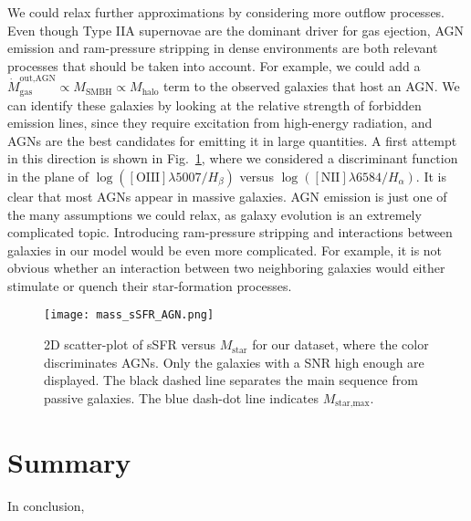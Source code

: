 \documentclass[fleqn,usenatbib]{mnras}
\begin{document}
We could relax further approximations by considering more outflow processes. Even though Type IIA supernovae are the dominant driver for gas ejection, AGN emission and ram-pressure stripping in dense environments are both relevant processes that should be taken into account. For example, we could add a $\dot{M}_\text{gas}^\text{out,AGN} \propto M_\text{SMBH} \propto M_\text{halo}$ term to the observed galaxies that host an AGN. We can identify these galaxies by looking at the relative strength of forbidden emission lines, since they require excitation from high-energy radiation, and AGNs are the best candidates for emitting it in large quantities. A first attempt in this direction is shown in Fig.~\ref{fig:mass_sSFR_AGN.png}, where we considered a discriminant function \citep{Kauffmann_2003_AGN} in the plane of $\log\left(\left[\text{OIII}\right]\lambda 5007 / H_\beta\right)$ versus $\log\left(\left[\text{NII}\right]\lambda 6584 / H_\alpha\right)$. It is clear that most AGNs appear in massive galaxies.
AGN emission is just one of the many assumptions we could relax, as galaxy evolution is an extremely complicated topic.
Introducing ram-pressure stripping and interactions between galaxies in our model would be even more complicated. For example, it is not obvious whether an interaction between two neighboring galaxies would either stimulate or quench their star-formation processes.
\begin{figure}\centering
	\texttt{[image: mass\_sSFR\_AGN.png]}
    \caption{2D scatter-plot of sSFR versus $M_\text{star}$ for our dataset, where the color discriminates AGNs. Only the galaxies with a SNR high enough are displayed. The black dashed line separates the main sequence from passive galaxies. The blue dash-dot line indicates $M_\text{star,max}$.}
    \label{fig:mass_sSFR_AGN.png}
\end{figure}



\section{Summary}\label{sec:summary}
In conclusion, 





 


\label{lastpage}
\end{document}
